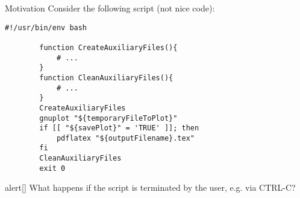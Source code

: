 
\begin{frame}[fragile]{Motivation}
    \vspace{-2mm}
    Consider the following script (\alert{not nice code}):
    \begin{lstlisting}[style=MyBash, aboveskip=3mm, belowskip=-5mm]
        #!/usr/bin/env bash

        function CreateAuxiliaryFiles(){
            # ...
        }
        function CleanAuxiliaryFiles(){
            # ...
        }
        CreateAuxiliaryFiles
        gnuplot "${temporaryFileToPlot}"
        if [[ "${savePlot}" = 'TRUE' ]]; then
            pdflatex "${outputFilename}.tex"
        fi
        CleanAuxiliaryFiles
        exit 0
    \end{lstlisting}
    \begin{varblock}{alert}[\textwidth]{}
        \Large \alert{What happens if the script is terminated by the user, e.g. via CTRL-C?}
    \end{varblock}
\end{frame}
